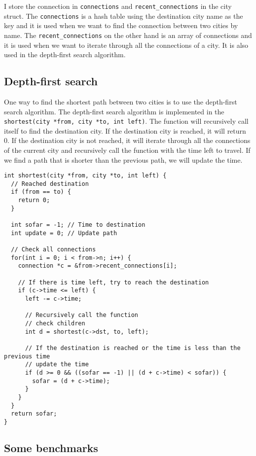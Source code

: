 \documentclass[a4paper,11pt]{article}
\begin{document}
I store the connection in {\tt *connections} and {\tt *recent\_connections} in the city struct.
The {\tt *connections} is a hash table using the destination city name as the key and it is used
when we want to find the connection between two cities by name. 
The {\tt *recent\_connections} on the other hand is an array of connections and it is used when
we want to iterate through all the connections of a city. It is also used in the depth-first search
algorithm.

\subsection*{Depth-first search}

One way to find the shortest path between two cities is to use the depth-first search algorithm.
The depth-first search algorithm is implemented in the {\tt shortest(city *from, city *to, int left)}.
The function will recursively call itself to find the destination city. If the destination city is reached,
it will return 0. If the destination city is not reached, it will iterate through all the connections of the
current city and recursively call the function with the time left to travel. If we find a path that is shorter
than the previous path, we will update the time.

\begin{verbatim}
int shortest(city *from, city *to, int left) {
  // Reached destination
  if (from == to) {
    return 0;
  }

  int sofar = -1; // Time to destination
  int update = 0; // Update path

  // Check all connections
  for(int i = 0; i < from->n; i++) {
    connection *c = &from->recent_connections[i];

    // If there is time left, try to reach the destination
    if (c->time <= left) {
      left -= c->time;

      // Recursively call the function
      // check children
      int d = shortest(c->dst, to, left);

      // If the destination is reached or the time is less than the previous time
      // update the time
      if (d >= 0 && ((sofar == -1) || (d + c->time) < sofar)) {
        sofar = (d + c->time);
      }
    }
  }
  return sofar;
}
\end{verbatim}

\subsection*{Some benchmarks}
\end{document}
